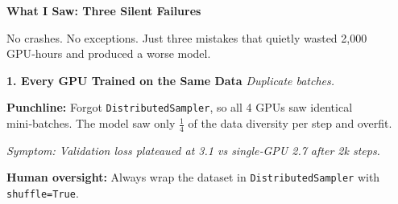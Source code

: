 \documentclass[11pt]{article}
\begin{document}
\vfill
\newpage



\vspace*{0.1in}

\begin{center}
{\fontsize{26}{30}\selectfont\color{brandnavy}\bfseries 
What I Saw: Three Silent Failures}
\end{center}

\vspace{0.1in}

{\small No crashes. No exceptions. Just three mistakes that quietly wasted 2,000 GPU‑hours and produced a worse model.}

\vspace{0.2in}

\begin{infobox}[top=5pt, bottom=5pt, left=10pt, right=10pt]
{\normalsize\color{brandblue}\textbf{1. Every GPU Trained on the Same Data}} \hfill {\footnotesize\color{brandorange}\textit{Duplicate batches.}}

\vspace{0.03in}
{\footnotesize\textbf{Punchline:} Forgot \texttt{DistributedSampler}, so all 4 GPUs saw identical mini‑batches. The model saw only $\frac{1}{4}$ of the data diversity per step and overfit.}

\vspace{0.02in}
{\footnotesize\color{brandgray}\textit{Symptom: Validation loss plateaued at 3.1 vs single‑GPU 2.7 after 2k steps.}}

\vspace{0.02in}
{\footnotesize\color{brandred}\textbf{Human oversight:} Always wrap the dataset in \texttt{DistributedSampler} with \texttt{shuffle=True}.}
\end{infobox}

\vspace{0.15in}
\end{document}

